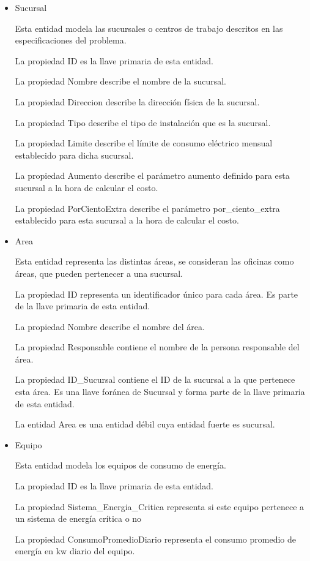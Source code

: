 \documentclass{article}
\begin{document}
\begin{itemize}
\item Sucursal

Esta entidad modela las sucursales o centros de trabajo descritos en las especificaciones del problema.

La propiedad ID es la llave primaria de esta entidad.

La propiedad Nombre describe el nombre de la sucursal.

La propiedad Direccion describe la dirección física de la sucursal.

La propiedad Tipo describe el tipo de instalación que es la sucursal.

La propiedad Limite describe el límite de consumo eléctrico mensual establecido para dicha sucursal.

La propiedad Aumento describe el parámetro aumento definido para esta sucursal a la hora de calcular el costo.

La propiedad PorCientoExtra describe el parámetro por\_ciento\_extra establecido para esta sucursal a la hora de calcular el costo.
\item Area

Esta entidad representa las distintas áreas, se consideran las oficinas como áreas, que pueden pertenecer a una sucursal.

La propiedad ID representa un identificador único para cada área. Es parte de la llave primaria de esta entidad.

La propiedad Nombre describe el nombre del área.

La propiedad Responsable contiene el nombre de la persona responsable del área.

La propiedad ID\_Sucursal contiene el ID de la sucursal a la que pertenece esta área. Es una llave foránea  de Sucursal y forma parte de la llave primaria de esta entidad.

La entidad Area es una entidad débil cuya entidad fuerte es sucursal.
\item Equipo

Esta entidad modela los equipos de consumo de energía.

La propiedad ID es la llave primaria de esta entidad.

La propiedad Sistema\_Energia\_Critica representa si este equipo pertenece a un sistema de energía crítica o no

La propiedad ConsumoPromedioDiario representa el consumo promedio de energía en kw diario del equipo.


\end{itemize}
\end{document}
